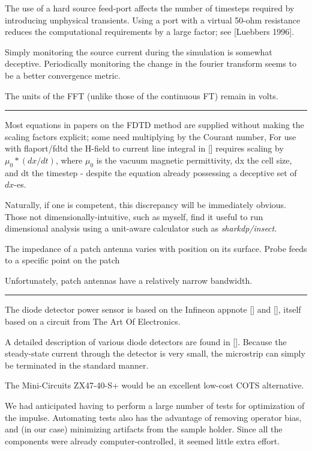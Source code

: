 \documentclass[paper.tex]{subfiles}
\begin{document}
The use of a hard source feed-port affects the number of timesteps required by introducing unphysical transients. Using a port with a virtual 50-ohm resistance reduces the computational requirements by a large factor; see [Luebbers 1996].

Simply monitoring the source current during the simulation is somewhat deceptive. Periodically monitoring the change in the fourier transform seems to be a better convergence metric.

The units of the FFT (unlike those of the continuous FT) remain in volts.

\rule{\linewidth}{0.2pt}

Most equations in papers on the FDTD method are supplied without making the scaling factors explicit; some need multiplying by the Courant number, For use with flaport/fdtd the H-field to current line integral in [] requires scaling by $\mu_0 * (dx/dt)$, where $\mu_0$ is the vacuum magnetic permittivity, dx the cell size, and dt the timestep - despite the equation already possessing a deceptive set of $dx$-es.

Naturally, if one is competent, this discrepancy will be immediately obvious. Those not dimensionally-intuitive, such as myself, find it useful to run dimensional analysis using a unit-aware calculator such as {\it sharkdp/insect}.


The impedance of a patch antenna varies with position on its surface. Probe feeds to a specific point on the patch

Unfortunately, patch antennas have a relatively narrow bandwidth.

\rule{\linewidth}{0.2pt}



The diode detector power sensor is based on the Infineon appnote [] and [], itself based on a circuit from The Art Of Electronics. 

A detailed description of various diode detectors are found in []. Because the steady-state current through the detector is very small, the microstrip can simply be terminated in the standard manner.

The Mini-Circuits ZX47-40-S+ would be an excellent low-cost COTS alternative.


We had anticipated having to perform a large number of tests for optimization of the impulse. Automating tests also has the advantage of removing operator bias, and (in our case) minimizing artifacts from the sample holder. Since all the components were already computer-controlled, it seemed little extra effort.
\end{document}
